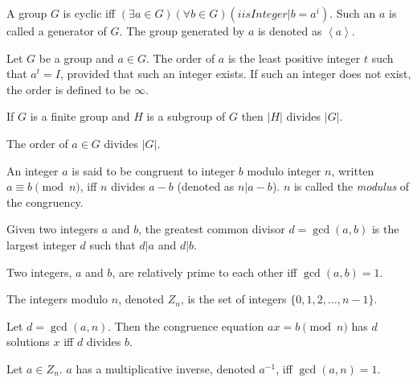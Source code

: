 \begin{defn}
  A group $G$ is cyclic iff $(\exists a \in G)(\forall b \in G)(i is
  Integer | b = a^i)$. Such an $a$ is called a generator of $G$. The
  group generated by $a$ is denoted as $\left< a \right>$.
\end{defn}

\begin{defn}[Order]
  Let $G$ be a group and $a \in G$. The order of $a$ is the least
  positive integer $t$ such that $a^t = I$, provided that such an
  integer exists.  If such an integer does not exist, the order is
  defined to be $\infty$.
\end{defn}

\begin{thm}
  If $G$ is a finite group and $H$ is a subgroup of $G$ then $|H|$ divides
  $|G|$.
\end{thm}

\begin{corr}
  The order of $a \in G$ divides $|G|$.
\end{corr}

\begin{defn}[Congruency]
  An integer $a$ is said to be congruent to integer $b$ modulo integer
  $n$, written $a \equiv b \pmod{n}$, iff $n$ divides $a-b$ (denoted as
  $n | a - b$). $n$ is called the \emph{modulus} of the congruency.
\end{defn}

\begin{defn}
  Given two integers $a$ and $b$, the greatest common divisor
  $d=\gcd(a,b)$ is the largest integer $d$ such that $d | a$ and $d | b$.
\end{defn}

\begin{defn}
  Two integers, $a$ and $b$, are relatively prime to each other iff
  \mbox{$\gcd(a,b)=1$}.
\end{defn}

\begin{defn}
  The integers modulo $n$, denoted $Z_n$, is the set of integers
  \mbox{$\{ 0,1,2,\ldots,n-1 \}$}.
\end{defn}

\begin{thm}
  Let $d = \gcd(a, n)$. Then the congruence equation $a x = b \pmod{n}$ has
  $d$ solutions $x$ iff $d$ divides $b$.
\end{thm}

\begin{corr}
  Let $a \in Z_n$. $a$ has a multiplicative inverse, denoted $a^{-1}$,
  iff \mbox{$\gcd(a, n) = 1$}.
\end{corr}

